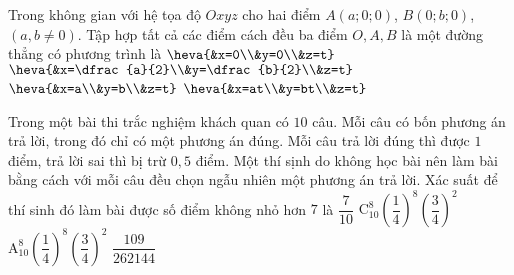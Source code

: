 \begin{ex}%
Trong không gian với hệ tọa độ $Oxyz$ cho hai điểm $A(a;0;0)$, $B(0;b;0)$, $(a,b \neq 0)$. Tập hợp tất cả các điểm cách đều ba điểm $O,A,B$ là một đường thẳng có phương trình là
\choice
{$\heva{&x=0\\&y=0\\&z=t}$}
{\True $\heva{&x=\dfrac{a}{2}\\&y=\dfrac{b}{2}\\&z=t}$}
{$\heva{&x=a\\&y=b\\&z=t}$}
{$\heva{&x=at\\&y=bt\\&z=t}$}
\end{ex}

\begin{ex}%
Trong một bài thi trắc nghiệm khách quan có $10$ câu. Mỗi câu có bốn phương án trả lời, trong đó chỉ có một phương án đúng. Mỗi câu trả lời đúng thì được $1$ điểm, trả lời sai thì bị trừ $0{,}5$ điểm. Một thí sịnh do không học bài nên làm bài bằng cách với mỗi câu đều chọn ngẫu nhiên một phương án trả lời. Xác suất để thí sinh đó làm bài được số điểm không nhỏ hơn $7$ là
\choice
{$\dfrac{7}{10}$}
{$\mathrm{C}_{10}^8 \left ( \dfrac{1}{4}\right )^8 \left ( \dfrac{3}{4}\right )^2$}
{$\mathrm{A}_{10}^8 \left ( \dfrac{1}{4}\right )^8 \left ( \dfrac{3}{4}\right )^2$}
{\True $\dfrac{109}{262144}$}
\end{ex}

